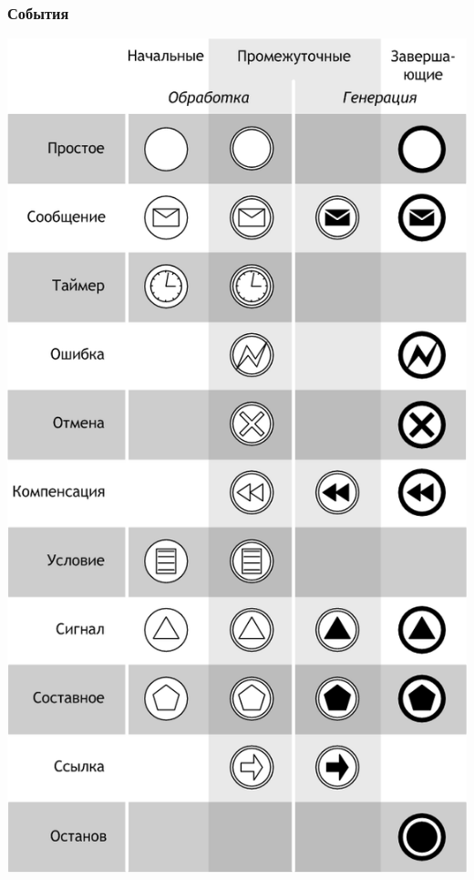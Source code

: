 \documentclass{../../slides-style}
\begin{document}
    \begin{frame}
        \frametitle{События}
        \begin{center}
            \includegraphics[height=0.8\textheight]{bpmnEvents.png}
        \end{center}
    \end{frame}
\end{document}
